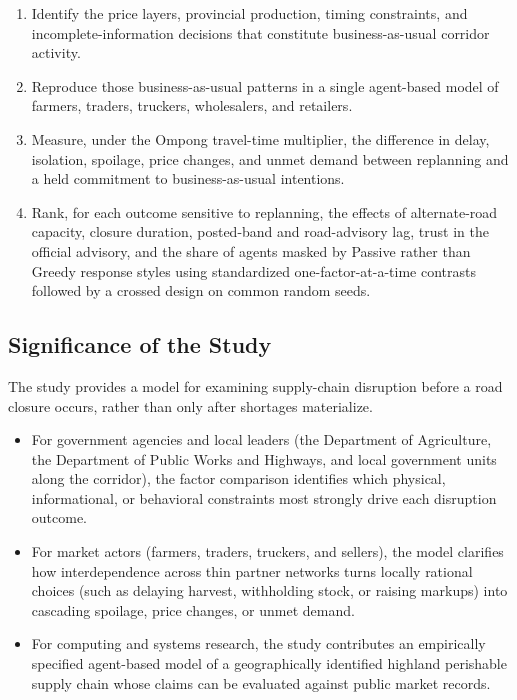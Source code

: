 \documentclass{icsthesis}
\begin{document}
\begin{mainmatter}
			\begin{enumerate}
				\item Identify the price layers, provincial production, timing constraints, and incomplete-information decisions that constitute business-as-usual corridor activity.
				\item Reproduce those business-as-usual patterns in a single agent-based model of farmers, traders, truckers, wholesalers, and retailers.
				\item Measure, under the Ompong travel-time multiplier, the difference in delay, isolation, spoilage, price changes, and unmet demand between replanning and a held commitment to business-as-usual intentions.
				\item Rank, for each outcome sensitive to replanning, the effects of alternate-road capacity, closure duration, posted-band and road-advisory lag, trust in the official advisory, and the share of agents masked by Passive rather than Greedy response styles using standardized one-factor-at-a-time contrasts followed by a crossed design on common random seeds.
			\end{enumerate}

			\subsection{Significance of the Study}

			The study provides a model for examining supply-chain disruption before a road closure occurs, rather than only after shortages materialize.

			\begin{itemize}
				\item For government agencies and local leaders (the Department of Agriculture, the Department of Public Works and Highways, and local government units along the corridor), the factor comparison identifies which physical, informational, or behavioral constraints most strongly drive each disruption outcome.
				\item For market actors (farmers, traders, truckers, and sellers), the model clarifies how interdependence across thin partner networks turns locally rational choices (such as delaying harvest, withholding stock, or raising markups) into cascading spoilage, price changes, or unmet demand.
				\item For computing and systems research, the study contributes an empirically specified agent-based model of a geographically identified highland perishable supply chain whose claims can be evaluated against public market records.
			\end{itemize}


\end{mainmatter}
\end{document}
